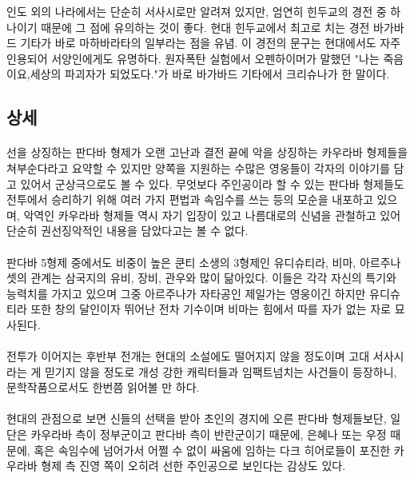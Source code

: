\documentclass[12pt, a4paper, oneside]{book}
\begin{document}
인도 외의 나라에서는 단순히 서사시로만 알려져 있지만, 엄연히 힌두교의 경전 중 하나이기 때문에 그 점에 유의하는 것이 좋다. 
현대 힌두교에서 최고로 치는 경전 바가바드 기타가 바로 마하바라타의 일부라는 점을 유념. 
이 경전의 문구는 현대에서도 자주 인용되어 서양인에게도 유명하다. 
원자폭탄 실험에서 오펜하이머가 말했던 "나는 죽음이요,세상의 파괴자가 되었도다."가 바로 바가바드 기타에서 크리슈나가 한 말이다.





\subsection{상세} 

\paragraph{}
선을 상징하는 판다바 형제가 오랜 고난과 결전 끝에 악을 상징하는 카우라바 형제들을 쳐부순다라고 요약할 수 있지만 양쪽을 지원하는 수많은 영웅들이 각자의 이야기를 담고 있어서 군상극으로도 볼 수 있다. 무엇보다 주인공이라 할 수 있는 판다바 형제들도 전투에서 승리하기 위해 여러 가지 편법과 속임수를 쓰는 등의 모순을 내포하고 있으며, 악역인 카우라바 형제들 역시 자기 입장이 있고 나름대로의 신념을 관철하고 있어 단순히 권선징악적인 내용을 담았다고는 볼 수 없다.

\paragraph{}
판다바 5형제 중에서도 비중이 높은 쿤티 소생의 3형제인 유디슈티라, 비마, 아르주나 셋의 관계는 삼국지의 유비, 장비, 관우와 많이 닮아있다. 이들은 각각 자신의 특기와 능력치를 가지고 있으며 그중 아르주나가 자타공인 제일가는 영웅이긴 하지만 유디슈티라 또한 창의 달인이자 뛰어난 전차 기수이며 비마는 힘에서 따를 자가 없는 자로 묘사된다.

\paragraph{}
전투가 이어지는 후반부 전개는 현대의 소설에도 떨어지지 않을 정도이며 고대 서사시라는 게 믿기지 않을 정도로 개성 강한 캐릭터들과 임팩트넘치는 사건들이 등장하니, 문학작품으로서도 한번쯤 읽어볼 만 하다.

\paragraph{}
현대의 관점으로 보면 신들의 선택을 받아 초인의 경지에 오른 판다바 형제들보단, 일단은 카우라바 측이 정부군이고 판다바 측이 반란군이기 때문에, 은혜나 또는 우정 때문에, 혹은 속임수에 넘어가서 어쩔 수 없이 싸움에 임하는 다크 히어로들이 포진한 카우라바 형제 측 진영 쪽이 오히려 선한 주인공으로 보인다는 감상도 있다.
\end{document}
